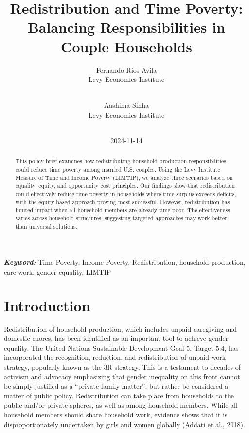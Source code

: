 \documentclass[
  11pt,
]{article}
\title{Redistribution and Time Poverty: Balancing Responsibilities in
Couple Households}
\author{
Fernando Rios-Avila\\
Levy Economics Institute\\
\\
\and 
Aashima Sinha\\
Levy Economics Institute\\
\\
}
\date{2024-11-14}
\begin{document}
\def\spacingset#1{\renewcommand{\baselinestretch}%
{#1}\small\normalsize} \spacingset{1}


\maketitle
\begin{abstract}
This policy brief examines how redistributing household production
responsibilities could reduce time poverty among married U.S. couples.
Using the Levy Institute Measure of Time and Income Poverty (LIMTIP), we
analyze three scenarios based on equality, equity, and opportunity cost
principles. Our findings show that redistribution could effectively
reduce time poverty in households where time surplus exceeds deficits,
with the equity-based approach proving most successful. However,
redistribution has limited impact when all household members are already
time-poor. The effectiveness varies across household structures,
suggesting targeted approaches may work better than universal solutions.
\end{abstract}
 
\vspace{.2in}

\textbf{\textit{Keyword: }}Time Poverty, Income Poverty, Redistribution,
household production, care work, gender equality, LIMTIP


\thispagestyle{empty}
\clearpage{}
\newpage
\spacingset{1.2} %
\section{Introduction}\label{introduction}

Redistribution of household production, which includes unpaid caregiving
and domestic chores, has been identified as an important tool to achieve
gender equality. The United Nations Sustainable Development Goal 5,
Target 5.4, has incorporated the recognition, reduction, and
redistribution of unpaid work strategy, popularly known as the 3R
strategy. This is a testament to decades of activism and advocacy
emphasizing that gender inequality on this front cannot be simply
justified as a ``private family matter'', but rather be considered a
matter of public policy. Redistribution can take place from households
to the public and/or private spheres, as well as among household
members. While all household members should share household work,
evidence shows that it is disproportionately undertaken by girls and
women globally (Addati et al., 2018).
\end{document}
